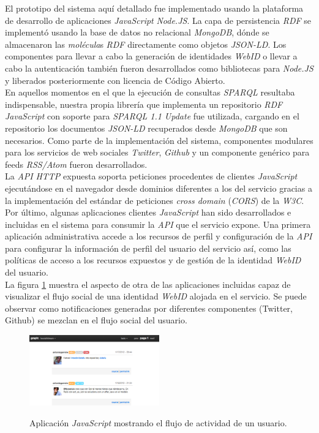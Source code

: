 El prototipo del sistema aqu\'i detallado fue implementado usando la plataforma de desarrollo de aplicaciones \textit{JavaScript} \textit{Node.JS}. La capa de persistencia \textit{RDF} se implement\'o usando la base de datos no relacional \textit{MongoDB}, d\'onde se almacenaron las \textit{mol\'ecula}s \textit{RDF} directamente como objetos \textit{JSON-LD}. Los componentes para llevar a cabo la generaci\'on de identidades \textit{WebID} o llevar a cabo la autenticaci\'on tambi\'en fueron desarrollados como bibliotecas para \textit{Node.JS} y liberados posteriormente con licencia de C\'odigo Abierto.\\
En aquellos momentos en el que la ejecuci\'on de consultas \textit{SPARQL} resultaba indispensable, nuestra propia librer\'ia que implementa un repositorio \textit{RDF} \textit{JavaScript} con soporte para \textit{SPARQL 1.1 Update} fue utilizada, cargando en el repositorio los documentos \textit{JSON-LD} recuperados desde \textit{MongoDB} que son necesarios.
Como parte de la implementaci\'on del sistema, componentes modulares para los servicios de web sociales \textit{Twitter}, \textit{Github} y un componente gen\'erico para feeds \textit{RSS/Atom} fueron desarrollados.\\
La \textit{API} \textit{HTTP} expuesta soporta peticiones procedentes de clientes \textit{JavaScript} ejecut\'andose en el navegador desde dominios diferentes a los del servicio gracias a la implementaci\'on del est\'andar de peticiones \textit{cross domain} (\textit{CORS}) \cite{cors} de la \textit{W3C}.\\
Por \'ultimo, algunas aplicaciones clientes \textit{JavaScript} han sido desarrollados e incluidas en el sistema para consumir la \textit{API} que el servicio expone. Una primera aplicaci\'on administrativa accede a los recursos de perfil y configuraci\'on de la \textit{API} para configurar la informaci\'on de perfil del usuario del servicio as\'i, como las pol\'iticas de acceso a los recursos expuestos y de gesti\'on de la identidad \textit{WebID} del usuario.\\
La figura \ref{figura6} muestra el aspecto de otra de las aplicaciones incluidas capaz de visualizar el flujo social de una identidad \textit{WebID} alojada en el servicio. Se puede observar como notificaciones generadas por diferentes componentes (Twitter, Github) se mezclan en el flujo social del usuario. \\

\begin{figure}
\vspace{2.4in}
\caption{Aplicaci\'on \textit{JavaScript} mostrando el flujo de actividad de un usuario.}
\includegraphics[width=0.5\textwidth]{figura6}
\label{figura6}
\end{figure}


